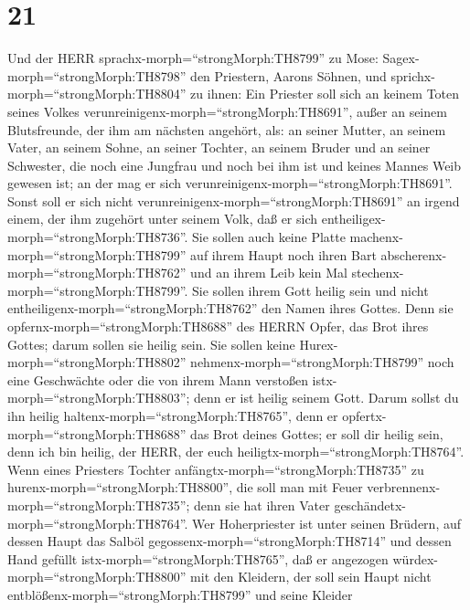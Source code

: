 \hypertarget{section-20}{%
\section{21}\label{section-20}}

 Und der HERR sprachx-morph=``strongMorph:TH8799'' zu Mose:
Sagex-morph=``strongMorph:TH8798'' den Priestern, Aarons Söhnen, und
sprichx-morph=``strongMorph:TH8804'' zu ihnen: Ein Priester soll sich an
keinem Toten seines Volkes verunreinigenx-morph=``strongMorph:TH8691'',
 außer an seinem Blutsfreunde, der ihm am nächsten angehört,
als: an seiner Mutter, an seinem Vater, an seinem Sohne, an seiner
Tochter, an seinem Bruder  und an seiner Schwester, die noch
eine Jungfrau und noch bei ihm ist und keines Mannes Weib gewesen ist;
an der mag er sich verunreinigenx-morph=``strongMorph:TH8691''.
 Sonst soll er sich nicht
verunreinigenx-morph=``strongMorph:TH8691'' an irgend einem, der ihm
zugehört unter seinem Volk, daß er sich
entheiligex-morph=``strongMorph:TH8736''.  Sie sollen auch
keine Platte machenx-morph=``strongMorph:TH8799'' auf ihrem Haupt noch
ihren Bart abscherenx-morph=``strongMorph:TH8762'' und an ihrem Leib
kein Mal stechenx-morph=``strongMorph:TH8799''.  Sie sollen
ihrem Gott heilig sein und nicht
entheiligenx-morph=``strongMorph:TH8762'' den Namen ihres Gottes. Denn
sie opfernx-morph=``strongMorph:TH8688'' des HERRN Opfer, das Brot ihres
Gottes; darum sollen sie heilig sein.  Sie sollen keine
Hurex-morph=``strongMorph:TH8802'' nehmenx-morph=``strongMorph:TH8799''
noch eine Geschwächte oder die von ihrem Mann verstoßen
istx-morph=``strongMorph:TH8803''; denn er ist heilig seinem Gott.
 Darum sollst du ihn heilig
haltenx-morph=``strongMorph:TH8765'', denn er
opfertx-morph=``strongMorph:TH8688'' das Brot deines Gottes; er soll dir
heilig sein, denn ich bin heilig, der HERR, der euch
heiligtx-morph=``strongMorph:TH8764''.  Wenn eines Priesters
Tochter anfängtx-morph=``strongMorph:TH8735'' zu
hurenx-morph=``strongMorph:TH8800'', die soll man mit Feuer
verbrennenx-morph=``strongMorph:TH8735''; denn sie hat ihren Vater
geschändetx-morph=``strongMorph:TH8764''.  Wer
Hoherpriester ist unter seinen Brüdern, auf dessen Haupt das Salböl
gegossenx-morph=``strongMorph:TH8714'' und dessen Hand gefüllt
istx-morph=``strongMorph:TH8765'', daß er angezogen
würdex-morph=``strongMorph:TH8800'' mit den Kleidern, der soll sein
Haupt nicht entblößenx-morph=``strongMorph:TH8799'' und seine Kleider
